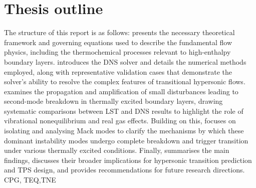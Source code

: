 
\section{Thesis outline}
The structure of this report is as follows:  presents the necessary theoretical framework and governing equations used to describe the fundamental flow physics, including the thermochemical processes relevant to high-enthalpy boundary layers.  introduces the \gls{DNS} solver and details the numerical methods employed, along with representative validation cases that demonstrate the solver’s ability to resolve the complex features of transitional hypersonic flows.  examines the propagation and amplification of small disturbances leading to second-mode breakdown in thermally excited boundary layers, drawing systematic comparisons between \gls{LST} and \gls{DNS} results to highlight the role of vibrational nonequilibrium and real gas effects. Building on this,  focuses on isolating and analysing Mack modes to clarify the mechanisms by which these dominant instability modes undergo complete breakdown and trigger transition under various thermally excited conditions. Finally,  summarises the main findings, discusses their broader implications for hypersonic transition prediction and \gls{TPS} design, and provides recommendations for future research directions. \gls{CPG}, \gls{TEQ},\gls{TNE}

